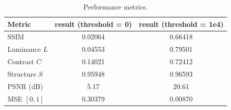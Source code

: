 \begin{table}[H]
    \centering
    \caption{Performance metrics.}
    \begin{tabular}{lcc}
        \toprule
        Metric & result (threshold = 0) & result (threshold = 1e4) \\
        \midrule
        SSIM & 0.02064 & 0.66418 \\
        Luminance $L$ & 0.04553 & 0.79501 \\
        Contrast $C$ & 0.14021 & 0.72412 \\
        Structure $S$ & 0.95948 & 0.96593 \\
        PSNR (dB) & 5.17 & 20.61 \\
        MSE $[0,1]$ & 0.30379 & 0.00870 \\
        \bottomrule
    \end{tabular}
\end{table}
